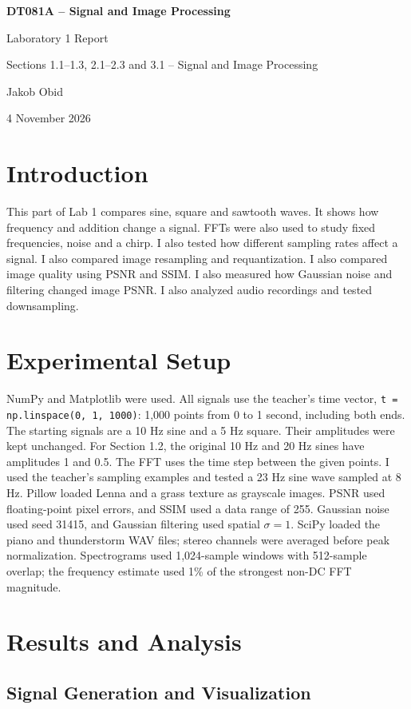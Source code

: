 \documentclass[11pt,a4paper]{article}
\begin{document}
\begin{center}
{\Large\bfseries DT081A -- Signal and Image Processing\par}
{\large Laboratory 1 Report\par}
Sections 1.1--1.3, 2.1--2.3 and 3.1 -- Signal and Image Processing\par
Jakob Obid\par
4 November 2026
\end{center}

\section{Introduction}
This part of Lab 1 compares sine, square and sawtooth waves.
It shows how frequency and addition change a signal.
FFTs were also used to study fixed frequencies, noise and a chirp.
I also tested how different sampling rates affect a signal.
I also compared image resampling and requantization.
I also compared image quality using PSNR and SSIM.
I also measured how Gaussian noise and filtering changed image PSNR.
I also analyzed audio recordings and tested downsampling.

\section{Experimental Setup}
NumPy and Matplotlib were used. All signals use the teacher's time vector,
\texttt{t = np.linspace(0, 1, 1000)}: 1,000 points from 0 to 1 second,
including both ends. The starting signals are a 10 Hz sine and a 5 Hz square.
Their amplitudes were kept unchanged.
For Section 1.2, the original 10 Hz and 20 Hz sines have amplitudes 1 and 0.5.
The FFT uses the time step between the given points.
I used the teacher's sampling examples and tested a 23 Hz sine wave sampled at 8 Hz.
Pillow loaded Lenna and a grass texture as grayscale images.
PSNR used floating-point pixel errors, and SSIM used a data range of 255.
Gaussian noise used seed 31415, and Gaussian filtering used spatial \(\sigma=1\).
SciPy loaded the piano and thunderstorm WAV files; stereo channels were averaged before peak normalization.
Spectrograms used 1,024-sample windows with 512-sample overlap; the frequency estimate used 1\% of the strongest non-DC FFT magnitude.

\section{Results and Analysis}
\subsection{Signal Generation and Visualization}
\end{document}
